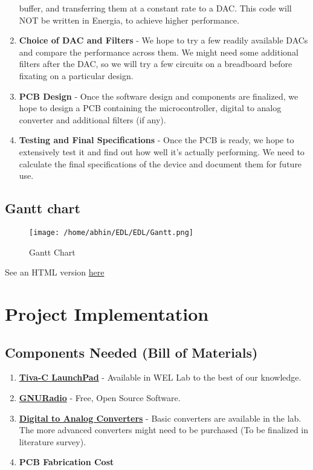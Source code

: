 \documentclass{article}
\begin{document}
\begin{enumerate}
buffer, and transferring them at a constant rate to a DAC. This code will NOT be written in
Energia, to achieve higher performance.
\item \textbf{Choice of DAC and Filters} - We hope to try a few readily available DACs and compare the performance across them. We might need some additional filters after the DAC, so we will try a few circuits on a breadboard before fixating on a particular design.
\item \textbf{PCB Design} - Once the software design and components are finalized, we hope to design a PCB containing the microcontroller, digital to analog converter and additional filters (if any).
\item \textbf{Testing and Final Specifications} - Once the PCB is ready, we hope to extensively test it and find out how well it’s actually performing. We need to calculate the final specifications of the device and document them for future use.
\end{enumerate}
\subsection{Gantt chart}
\begin{figure}[htp]
\centering
\texttt{[image: /home/abhin/EDL/EDL/Gantt.png]}
\caption{Gantt Chart}
\label{}
\end{figure}
See an HTML version \href{http://publish.smartsheet.com/5856566e76a544e7a8add24073379be7}{here}
\section{Project Implementation}
\subsection{Components Needed (Bill of Materials)}
\begin{enumerate}
\item \textbf{\href{https://en.wikipedia.org/wiki/Tiva-C_LaunchPad}{Tiva-C LaunchPad}} - Available in WEL Lab to the best of our knowledge.
\item \textbf{\href{http://gnuradio.org/}{GNURadio}} - Free, Open Source Software.
\item \textbf{\href{https://en.wikipedia.org/wiki/Digital-to-analog_converter}{Digital to Analog Converters}} - Basic converters are available in the lab. The more
advanced converters might need to be purchased (To be finalized in literature survey).
\item \textbf{PCB Fabrication Cost}
\end{enumerate}
\end{document}
